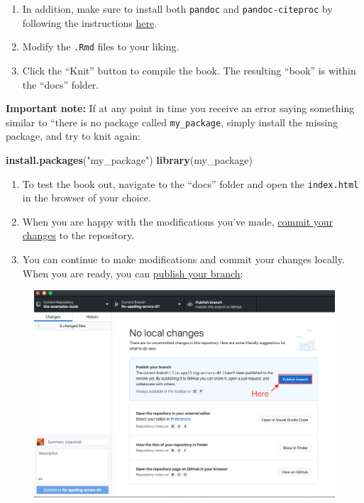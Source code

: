 \documentclass[]{book}
\newenvironment{Shaded}{\begin{snugshade}}{\end{snugshade}}
\newcommand{\KeywordTok}[1]{\textcolor[rgb]{0.13,0.29,0.53}{\textbf{#1}}}
\newcommand{\StringTok}[1]{\textcolor[rgb]{0.31,0.60,0.02}{#1}}
\newcommand{\NormalTok}[1]{#1}
\providecommand{\tightlist}{%
  \setlength{\itemsep}{0pt}\setlength{\parskip}{0pt}}
\begin{document}
\begin{enumerate}
\def\labelenumi{\arabic{enumi}.}
\setcounter{enumi}{12}
\item
  In addition, make sure to install both \texttt{pandoc} and
  \texttt{pandoc-citeproc} by following the instructions
  \href{https://pandoc.org/installing.html}{here}.
\item
  Modify the \texttt{.Rmd} files to your liking.
\item
  Click the ``Knit'' button to compile the book. The resulting ``book''
  is within the ``docs'' folder.
\end{enumerate}

\textbf{Important note:} If at any point in time you receive an error
saying something similar to ``there is no package called
\texttt{my\_package}, simply install the missing package, and try to
knit again:

\begin{Shaded}
\begin{Highlighting}[]
\KeywordTok{install.packages}\NormalTok{(}\StringTok{"my_package"}\NormalTok{)}
\KeywordTok{library}\NormalTok{(my_package)}
\end{Highlighting}
\end{Shaded}

\begin{enumerate}
\def\labelenumi{\arabic{enumi}.}
\setcounter{enumi}{15}
\tightlist
\item
  To test the book out, navigate to the ``docs'' folder and open the
  \texttt{index.html} in the browser of your choice.
\item
  When you are happy with the modifications you've made,
  \protect\hyperlink{github-desktop-commit-changes}{commit your changes}
  to the repository.
\item
  You can continue to make modifications and commit your changes
  locally. When you are ready, you can
  \protect\hyperlink{github-desktop-publish-branch}{publish your
  branch}:
\end{enumerate}

\begin{figure}
\centering
\includegraphics{./images/gh-desktop-13.png}
\caption{}
\end{figure}
\end{document}
